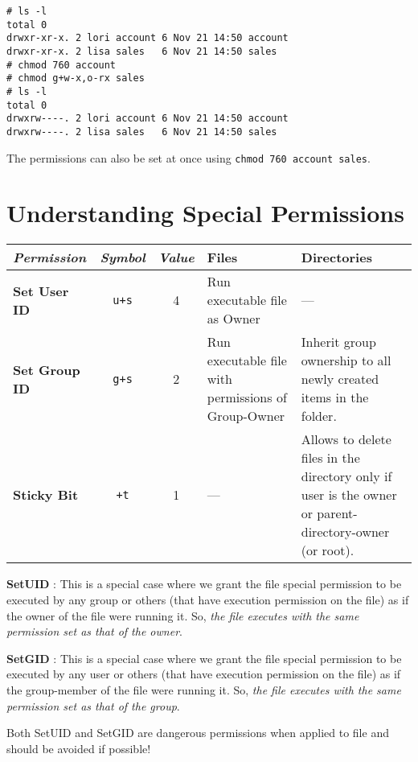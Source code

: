 \vspace{-15pt}
\begin{verbatim}
# ls -l
total 0
drwxr-xr-x. 2 lori account 6 Nov 21 14:50 account
drwxr-xr-x. 2 lisa sales   6 Nov 21 14:50 sales
# chmod 760 account
# chmod g+w-x,o-rx sales
# ls -l
total 0
drwxrw----. 2 lori account 6 Nov 21 14:50 account
drwxrw----. 2 lisa sales   6 Nov 21 14:50 sales
\end{verbatim}
\vspace{-10pt}

\noindent
The permissions can also be set at once using \verb|chmod 760 account sales|.

	\section{Understanding Special Permissions}

\begin{tabular}{P{0.1}ccM{0.22}M{0.37}}
	\toprule
	\textit{Permission} 
	&\textit{Symbol} 
	&\textit{Value} 
	&\textbf{Files} 
	&\textbf{Directories} \\
	\midrule
	\textbf{Set User ID} 
	&\verb|u+s| 
	&4 
	&Run executable file as Owner 
	&--- \\
	\midrule
	\textbf{Set Group ID}
	&\verb|g+s| 
	&2 
	&Run executable file with permissions of Group-Owner 
	&Inherit group ownership to all newly created items in the folder. \\
	\midrule
	\textbf{Sticky Bit} 	
	&\verb|+t| 
	&1 
	&--- 
	&Allows to delete files in the directory only if user is the owner or parent-directory-owner (or root). \\
	\bottomrule
\end{tabular}

\noindent
\textbf{SetUID} : This is a special case where we grant the file special permission to be executed by any group or others (that have execution permission on the file) as if the owner of the file were running it. So, \textit{the file executes with the same permission set as that of the owner}.

\noindent
\textbf{SetGID} : This is a special case where we grant the file special permission to be executed by any user or others (that have execution permission on the file) as if the group-member of the file were running it. So, \textit{the file executes with the same permission set as that of the group}.

Both SetUID and SetGID are dangerous permissions when applied to file and should be avoided if possible!

